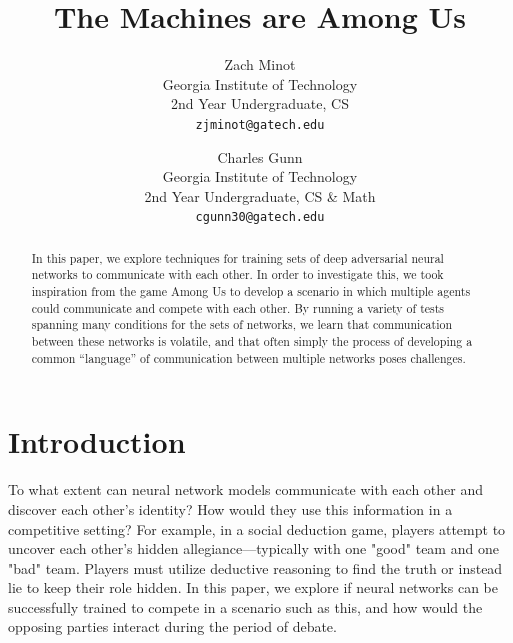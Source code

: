 \documentclass[10pt,twocolumn,letterpaper]{article}
\begin{document}
\title{The Machines are Among Us}

\author{Zach Minot\\
Georgia Institute of Technology\\
2nd Year Undergraduate, CS\\
{\tt\small zjminot@gatech.edu}
\and
Charles Gunn\\
Georgia Institute of Technology\\
2nd Year Undergraduate, CS \& Math\\
{\tt\small cgunn30@gatech.edu}
}

\maketitle

\begin{abstract}
   In this paper, we explore techniques for training sets of deep adversarial neural networks
   to communicate with each other. In order to investigate this, we took inspiration
   from the game Among Us to develop a scenario in which multiple agents could
   communicate and compete with each other. By running a variety of tests spanning
   many conditions for the sets of networks, we learn that communication between
   these networks is volatile, and that often simply the process of developing a
   common ``language'' of communication between multiple networks poses
   challenges.
\end{abstract}

\section{Introduction}
To what extent can neural network models communicate with each other and discover
each other's identity? How would they use this information in a competitive setting?
For example, in a social deduction game, players attempt to uncover each other's
hidden allegiance---typically with one "good" team and one "bad" team.
Players must utilize deductive reasoning to find the truth or instead
lie to keep their role hidden. In this paper, we explore 
if neural networks can be successfully trained to
compete in a scenario such as this, and how would the opposing parties interact
during the period of debate.
\end{document}
